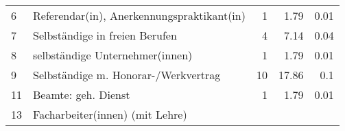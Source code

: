\begin{longtable}{lXrrr}
     6 &
     \multicolumn{1}{X}{ Referendar(in), Anerkennungspraktikant(in)   } &


       \num{1} &
       \num[round-mode=places,round-precision=2]{1,79} &
         \num[round-mode=places,round-precision=2]{0,01} \\

     7 &
     \multicolumn{1}{X}{ Selbständige in freien Berufen   } &


       \num{4} &
       \num[round-mode=places,round-precision=2]{7,14} &
         \num[round-mode=places,round-precision=2]{0,04} \\

     8 &
     \multicolumn{1}{X}{ selbständige Unternehmer(innen)   } &


       \num{1} &
       \num[round-mode=places,round-precision=2]{1,79} &
         \num[round-mode=places,round-precision=2]{0,01} \\

     9 &
     \multicolumn{1}{X}{ Selbständige m. Honorar-/Werkvertrag   } &


       \num{10} &
       \num[round-mode=places,round-precision=2]{17,86} &
         \num[round-mode=places,round-precision=2]{0,1} \\

     11 &
     \multicolumn{1}{X}{ Beamte: geh. Dienst   } &


       \num{1} &
       \num[round-mode=places,round-precision=2]{1,79} &
         \num[round-mode=places,round-precision=2]{0,01} \\

     13 &
     \multicolumn{1}{X}{ Facharbeiter(innen) (mit Lehre)   } &



\end{longtable}
